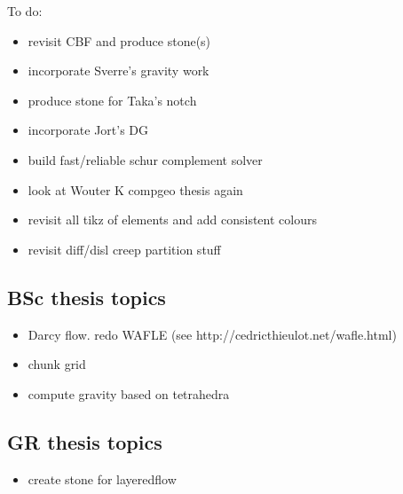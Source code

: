 To do:

\begin{itemize}
\item revisit CBF and produce stone(s)
\item incorporate Sverre's gravity work
\item produce stone for Taka's notch
\item incorporate Jort's DG 
\item build fast/reliable schur complement solver\
\item look at Wouter K compgeo thesis again
\item revisit all tikz of elements and add consistent colours
\item revisit diff/disl creep partition stuff
\end{itemize}



\subsection{BSc thesis topics}
\begin{itemize} 
\item Darcy flow. redo WAFLE (see http://cedricthieulot.net/wafle.html)
\item chunk grid
\item compute gravity based on tetrahedra
\end{itemize}

\subsection{GR thesis topics}
\begin{itemize} 
\item create stone for layeredflow 
\end{itemize}

